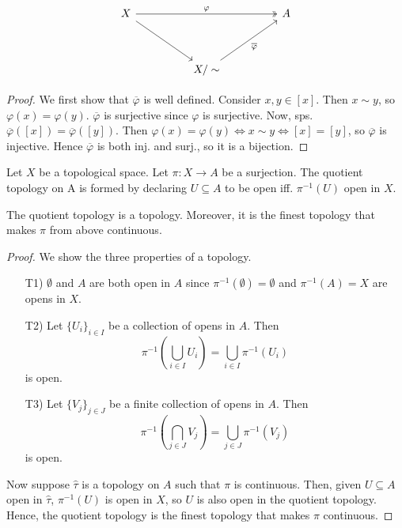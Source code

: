 \[\begin{tikzcd}
	X &&&& A \\
	\\
	&& {X/\sim}
	\arrow["\varphi", two heads, from=1-1, to=1-5]
	\arrow[from=1-1, to=3-3]
	\arrow["{\overline{\varphi}}"', from=3-3, to=1-5]
\end{tikzcd}\]

\begin{proof}
  We first show that \( \overline{\varphi} \) is well defined.
  Consider \( x, y \in [x] \). Then \( x \sim y \), so 
  \( \varphi(x) = \varphi(y) \).
  \( \overline{\varphi} \) is surjective since
  \( \varphi \) is surjective.
  Now, sps. \( \overline{\varphi}([x]) = \overline{\varphi}([y]) \).
  Then
  \( \varphi(x) = \varphi(y) \iff x \sim y \iff [x] = [y] \),
  so \( \overline{\varphi} \) is injective.
  Hence \( \overline{\varphi} \) is both inj. and surj.,
  so it is a bijection.
\end{proof}

\begin{definition}
  Let \( X \) be a topological space.
  Let \( \pi: X \to A \) be a surjection.
  The quotient topology on A is formed by declaring
  \( U \subseteq A \) to be open iff. \( {\pi}^{-1} (U) \)
  open in \( X \). 
\end{definition}

\begin{proposition}
  The quotient topology is a topology.
  Moreover, it is the finest topology
  that makes \( \pi \) from above continuous.
\end{proposition}

\begin{proof}
  We show the three properties of a topology.
  \begin{enumerate}
    \item[T1)]
      \( \emptyset \) and \( A \) are both open in \( A \)
    since \( {\pi}^{-1}(\emptyset) = \emptyset  \) and
    \( {\pi}^{-1} (A) = X \) are opens in \( X \).
    \item[T2)]
      Let \( \{ U_i   \}_{i \in I}  \) be a collection
      of opens in \( A \). Then
      \[
        {\pi}^{-1} \left(\bigcup_{i \in I} U_i\right)
        = \bigcup_{i \in I} {\pi}^{-1}  (U_i)
      \]
      is open.
    \item[T3)]
      Let \( \{ V_j   \}_{j \in J}  \) be a finite
      collection of opens in \( A \). Then
      \[
        {\pi}^{-1} \left(\bigcap_{j \in J} V_j\right)
        = \bigcup_{j \in J} {\pi}^{-1}  (V_j)
      \]
      is open.
  \end{enumerate}
  Now suppose \( \hat{\tau} \) is a topology on \( A \)
  such that \( \pi \) is continuous. Then, given \( U \subseteq A \)
  open in \( \hat{\tau} \), 
  \( {\pi}^{-1} (U) \) is open in \( X \),
  so \( U \) is also open in the quotient topology.
  Hence, the quotient topology is the finest topology
  that makes \( \pi \) continuous.
\end{proof}

